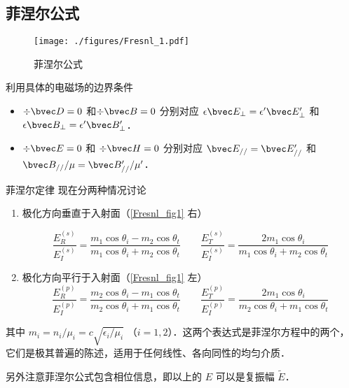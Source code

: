 
\begin{issues}
\issueTODO
\end{issues}


\subsection{菲涅尔公式}
\begin{figure}[ht]
\centering
\texttt{[image: ./figures/Fresnl\_1.pdf]}
\caption{菲涅尔公式} \label{Fresnl_fig1}
\end{figure}
 
利用具体的电磁场的边界条件 %
\begin{itemize}
\item $\div \bvec D = 0$ 和$\div \bvec B = 0$  分别对应 $\epsilon \bvec E_\bot = \epsilon' \bvec E'_\bot$ 和 $\epsilon \bvec B_\bot = \epsilon' \bvec B'_\bot$．

\item $\div \bvec E = 0$ 和 $\div \bvec H = 0$ 分别对应 $\bvec E_{//} = \bvec E'_{//}$ 和 $\bvec B_{//}/\mu = \bvec B'_{//}/\mu'$．
\end{itemize}

\begin{theorem}{菲涅尔定律}
现在分两种情况讨论
\begin{enumerate}
\item 极化方向垂直于入射面（\autoref{Fresnl_fig1} 右）

\begin{equation}
\frac{E_R^{(s)}}{E_I^{(s)}} =  \frac{m_1\cos{\theta_i} - m_2\cos\theta_t}{m_1\cos\theta_i + m_2\cos\theta_t}
\qquad
\frac{E_T^{(s)}}{E_I^{(s)}} = \frac{2 m_1\cos\theta_i}{m_1\cos\theta_i + m_2\cos\theta_t}
\end{equation}

\item 极化方向平行于入射面（\autoref{Fresnl_fig1} 左）
\begin{equation}\label{Fresnl_eq2}
\frac{E_R^{(p)}}{E_I^{(p)}} =  \frac{m_2\cos\theta_i - m_1\cos\theta_t}{m_2 \cos\theta_i + m_1\cos\theta_t}
\qquad
\frac{E_T^{(p)}}{E_I^{(p)}} =  \frac{2 m_1\cos\theta_i}{m_2\cos\theta_i + m_1\cos\theta_t}
\end{equation}
\end{enumerate}
其中 $m_i=n_i/\mu_i = c\sqrt{\epsilon_i/\mu_i}$ （$i=1,2$）．这两个表达式是菲涅尔方程中的两个，它们是极其普遍的陈述，适用于任何线性、各向同性的均匀介质．

另外注意菲涅尔公式包含相位信息，即以上的 $E$ 可以是复振幅 $\tilde E$．
\end{theorem}

